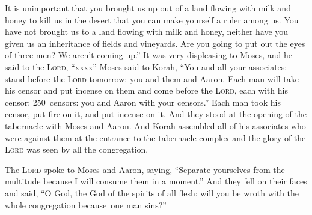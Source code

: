 \begin{inparaenum}
     It is unimportant that you brought us up out of a land flowing with milk and honey to kill us in the desert that you can make yourself a ruler among us.%
     You have not brought us to a land flowing with milk and honey, neither have you given us an inheritance of fields and vineyards. Are you going to put out the eyes of three men? We aren't coming up.''%
     It was very displeasing to Moses, and he said to the \textsc{Lord}, ``xxxx''%
     Moses said to Korah, ``You and all your associates: stand before the \textsc{Lord} tomorrow: you and them and Aaron.%
     Each man will take his censor and put incense on them and come before the \textsc{Lord}, each with his censor: 250~censors: you and Aaron with your censors.''%
     Each man took his censor, put fire on it, and put incense on it. And they stood at the opening of the tabernacle with Moses and Aaron.%
     And Korah assembled all of his associates who were against them at the entrance to the tabernacle complex and the glory of the \textsc{Lord} was seen by all the congregation.%
    
     The \textsc{Lord} spoke to Moses and Aaron, saying,%
     ``Separate yourselves from the multitude because I will consume them in a moment.''%
     And they fell on their faces and said, ``O God, the God of the spirits of all flesh: will you be wroth with the whole congregation because\understood\ one man sins?''%
    

\end{inparaenum}
